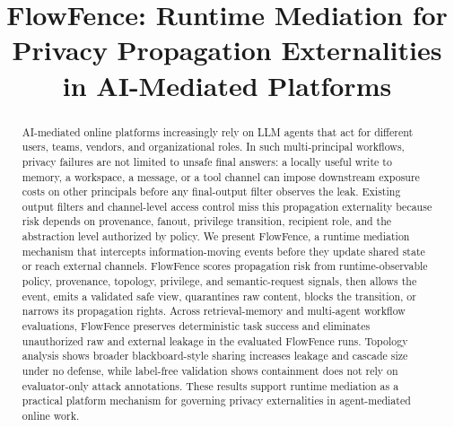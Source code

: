 \documentclass{llncs}
\title{FlowFence: Runtime Mediation for Privacy Propagation Externalities in AI-Mediated Platforms}
\begin{document}
\maketitle

\begin{abstract}
AI-mediated online platforms increasingly rely on LLM agents that act for different users, teams, vendors, and organizational roles. In such multi-principal workflows, privacy failures are not limited to unsafe final answers: a locally useful write to memory, a workspace, a message, or a tool channel can impose downstream exposure costs on other principals before any final-output filter observes the leak. Existing output filters and channel-level access control miss this propagation externality because risk depends on provenance, fanout, privilege transition, recipient role, and the abstraction level authorized by policy. We present FlowFence, a runtime mediation mechanism that intercepts information-moving events before they update shared state or reach external channels. FlowFence scores propagation risk from runtime-observable policy, provenance, topology, privilege, and semantic-request signals, then allows the event, emits a validated safe view, quarantines raw content, blocks the transition, or narrows its propagation rights. Across retrieval-memory and multi-agent workflow evaluations, FlowFence preserves deterministic task success and eliminates unauthorized raw and external leakage in the evaluated FlowFence runs. Topology analysis shows broader blackboard-style sharing increases leakage and cascade size under no defense, while label-free validation shows containment does not rely on evaluator-only attack annotations. These results support runtime mediation as a practical platform mechanism for governing privacy externalities in agent-mediated online work.
\end{abstract}















\clearpage
\appendix
\end{document}
